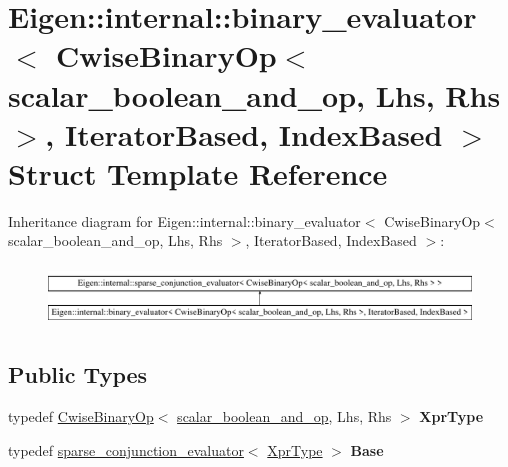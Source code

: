 \hypertarget{struct_eigen_1_1internal_1_1binary__evaluator_3_01_cwise_binary_op_3_01scalar__boolean__and__op_e9805903bdca4d8b3e2f0d1430158176}{}\section{Eigen\+::internal\+::binary\+\_\+evaluator$<$ Cwise\+Binary\+Op$<$ scalar\+\_\+boolean\+\_\+and\+\_\+op, Lhs, Rhs $>$, Iterator\+Based, Index\+Based $>$ Struct Template Reference}
\label{struct_eigen_1_1internal_1_1binary__evaluator_3_01_cwise_binary_op_3_01scalar__boolean__and__op_e9805903bdca4d8b3e2f0d1430158176}
Inheritance diagram for Eigen\+::internal\+::binary\+\_\+evaluator$<$ Cwise\+Binary\+Op$<$ scalar\+\_\+boolean\+\_\+and\+\_\+op, Lhs, Rhs $>$, Iterator\+Based, Index\+Based $>$\+:\begin{figure}[H]
\begin{center}
\leavevmode
\includegraphics[height=1.620839cm]{struct_eigen_1_1internal_1_1binary__evaluator_3_01_cwise_binary_op_3_01scalar__boolean__and__op_e9805903bdca4d8b3e2f0d1430158176}
\end{center}
\end{figure}
\subsection*{Public Types}
\begin{DoxyCompactItemize}
\item 
\mbox{\label{struct_eigen_1_1internal_1_1binary__evaluator_3_01_cwise_binary_op_3_01scalar__boolean__and__op_e9805903bdca4d8b3e2f0d1430158176_aae75565ff2eef6dcd3cdb26247dca232}} 
typedef \mbox{\hyperlink{class_eigen_1_1_cwise_binary_op}{Cwise\+Binary\+Op}}$<$ \mbox{\hyperlink{struct_eigen_1_1internal_1_1scalar__boolean__and__op}{scalar\+\_\+boolean\+\_\+and\+\_\+op}}, Lhs, Rhs $>$ {\bfseries Xpr\+Type}
\item 
\mbox{\label{struct_eigen_1_1internal_1_1binary__evaluator_3_01_cwise_binary_op_3_01scalar__boolean__and__op_e9805903bdca4d8b3e2f0d1430158176_a993955e35964a2108462990f0df9f047}} 
typedef \mbox{\hyperlink{struct_eigen_1_1internal_1_1sparse__conjunction__evaluator}{sparse\+\_\+conjunction\+\_\+evaluator}}$<$ \mbox{\hyperlink{class_eigen_1_1_cwise_binary_op}{Xpr\+Type}} $>$ {\bfseries Base}
\end{DoxyCompactItemize}
